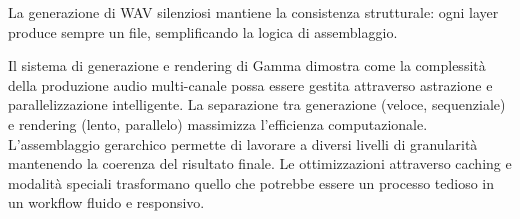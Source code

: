 La generazione di WAV silenziosi mantiene la consistenza strutturale: ogni layer produce sempre un file, semplificando la logica di assemblaggio.

Il sistema di generazione e rendering di Gamma dimostra come la complessità della produzione audio multi-canale possa essere gestita attraverso astrazione e parallelizzazione intelligente. La separazione tra generazione (veloce, sequenziale) e rendering (lento, parallelo) massimizza l'efficienza computazionale. L'assemblaggio gerarchico permette di lavorare a diversi livelli di granularità mantenendo la coerenza del risultato finale. Le ottimizzazioni attraverso caching e modalità speciali trasformano quello che potrebbe essere un processo tedioso in un workflow fluido e responsivo.